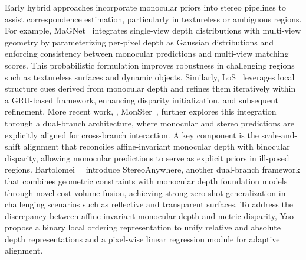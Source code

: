 Early hybrid approaches incorporate monocular priors into stereo pipelines to assist correspondence estimation, particularly in textureless or ambiguous regions.
For example, MaGNet~\cite{bae2022multi} integrates single-view depth distributions with multi-view geometry by parameterizing per-pixel depth as Gaussian distributions and enforcing consistency between monocular predictions and multi-view matching scores.
This probabilistic formulation improves robustness in challenging regions such as textureless surfaces and dynamic objects.
Similarly, LoS~\cite{li2024local} leverages local structure cues derived from monocular depth and refines them iteratively within a GRU-based framework, enhancing disparity initialization, and subsequent refinement.
More recent work, \eg, MonSter~\cite{cheng2025monster}, further explores this integration through a dual-branch architecture, where monocular and stereo predictions are explicitly aligned for cross-branch interaction.
A key component is the scale-and-shift alignment that reconciles affine-invariant monocular depth with binocular disparity, allowing monocular predictions to serve as explicit priors in ill-posed regions. %
Bartolomei~\etal~\cite{bartolomei2024stereo} introduce StereoAnywhere, another dual-branch framework that combines geometric constraints with monocular depth foundation models through novel cost volume fusion, achieving strong zero-shot generalization in challenging scenarios such as reflective and transparent surfaces.
To address the discrepancy between affine-invariant monocular depth and metric disparity, Yao~\etal~\cite{yao2025diving} propose a binary local ordering representation to unify relative and absolute depth representations and a pixel-wise linear regression module for adaptive alignment.


